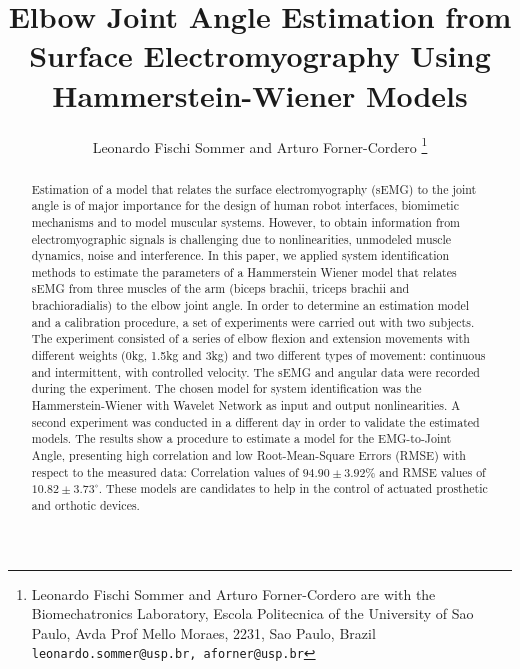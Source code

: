 \documentclass[letterpaper, 10 pt, conference]{ieeeconf}  %
\title{\LARGE \bf Elbow Joint Angle Estimation from Surface Electromyography Using Hammerstein-Wiener Models
}
\author{Leonardo Fischi Sommer and Arturo Forner-Cordero%
\thanks{Leonardo Fischi Sommer and Arturo Forner-Cordero are with the Biomechatronics Laboratory, Escola Politecnica of the University of Sao Paulo, Avda Prof Mello Moraes, 2231, Sao Paulo, Brazil {\tt\small leonardo.sommer@usp.br, aforner@usp.br}}
}
\begin{document}
\maketitle
\thispagestyle{empty}
\pagestyle{empty}


\begin{abstract}


Estimation of a model that relates the surface electromyography (sEMG) to the joint angle is of major importance for the design of human robot interfaces, biomimetic mechanisms and to model muscular systems. However, to obtain information from electromyographic signals is challenging due to nonlinearities, unmodeled muscle dynamics, noise and interference. In this paper, we applied system identification methods to estimate the parameters of a Hammerstein Wiener model that relates sEMG from three muscles of the arm (biceps brachii, triceps brachii and brachioradialis) to the elbow joint angle. In order to determine an estimation model and a calibration procedure, a set of experiments were carried out with two subjects. The experiment consisted of a series of elbow flexion and extension movements with different weights (0kg, 1.5kg and 3kg) and two different types of movement: continuous and intermittent, with controlled velocity. The sEMG and angular data were recorded during the experiment. The chosen model for system identification was the Hammerstein-Wiener with Wavelet Network as input and output nonlinearities. A second experiment was conducted in a different day in order to validate the estimated models. The results show a procedure to estimate a model for the EMG-to-Joint Angle, presenting high correlation and low Root-Mean-Square Errors (RMSE) with respect to the measured data: Correlation values of $94.90 \pm 3.92\%$ and RMSE values of $10.82 \pm 3.73^\circ$. 
These models are candidates to help in the control of actuated prosthetic and orthotic devices.


\end{abstract}
\end{document}
